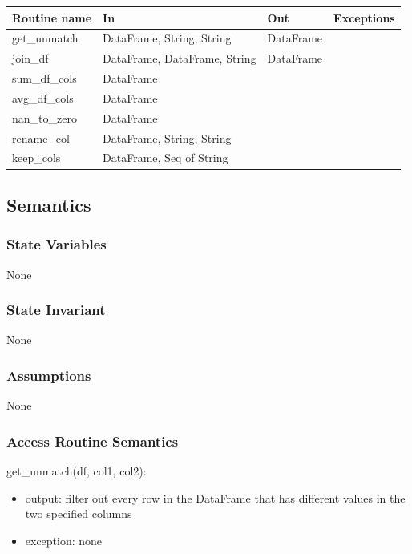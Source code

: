 \documentclass[12pt]{article}
\begin{document}
\begin{tabular}{| l | l | l | p{5cm} |}
\hline
\textbf{Routine name} & \textbf{In} & \textbf{Out} & \textbf{Exceptions}\\
\hline
get\_unmatch & DataFrame, String, String & DataFrame & \\
\hline
join\_df & DataFrame, DataFrame, String & DataFrame & \\
\hline
sum\_df\_cols & DataFrame & & \\
\hline
avg\_df\_cols & DataFrame &  & \\
\hline
nan\_to\_zero & DataFrame&  & \\
\hline
rename\_col & DataFrame, String, String &  & \\
\hline
keep\_cols & DataFrame, Seq of String &  & \\
\hline

\end{tabular}

\subsection* {Semantics}

\subsubsection* {State Variables}

None

\subsubsection* {State Invariant}

None

\subsubsection* {Assumptions}

None

\subsubsection* {Access Routine Semantics}

\noindent get\_unmatch(df, col1, col2):
\begin{itemize}
    \item output: filter out every row in the DataFrame that has different values in the two specified columns
    \item exception: none
\end{itemize}
\end{document}
